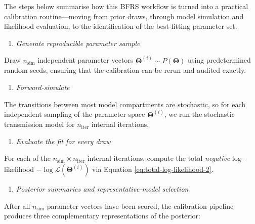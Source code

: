 \documentclass[
]{book}
\providecommand{\tightlist}{%
  \setlength{\itemsep}{0pt}\setlength{\parskip}{0pt}}
\begin{document}
The steps below summarise how this BFRS workflow is turned into a practical calibration routine---moving from prior draws, through model simulation and likelihood evaluation, to the identification of the best-fitting parameter set.

\begin{enumerate}
\def\labelenumi{\arabic{enumi}.}
\tightlist
\item
  \emph{Generate reproducible parameter sample}
\end{enumerate}

Draw \(n_{\text{sim}}\) independent parameter vectors \(\boldsymbol{\Theta}^{(i)} \sim P(\boldsymbol{\Theta})\) using predetermined random seeds, ensuring that the calibration can be rerun and audited exactly.

\begin{enumerate}
\def\labelenumi{\arabic{enumi}.}
\setcounter{enumi}{1}
\tightlist
\item
  \emph{Forward-simulate}
\end{enumerate}

The transitions between most model compartments are stochastic, so for each independent sampling of the parameter space \(\boldsymbol{\Theta}^{(i)}\), we run the stochastic transmission model for \(n_{\text{iter}}\) internal iterations.

\begin{enumerate}
\def\labelenumi{\arabic{enumi}.}
\setcounter{enumi}{2}
\tightlist
\item
  \emph{Evaluate the fit for every draw}
\end{enumerate}

For each of the \(n_{\text{sim}} \times n_{\text{iter}}\) internal iterations, compute the total \emph{negative} log-likelihood \(-\log\mathcal{L}(\boldsymbol{\Theta}^{(i)})\) via Equation \eqref{eq:total-log-likelihood-2}.

\begin{enumerate}
\def\labelenumi{\arabic{enumi}.}
\setcounter{enumi}{3}
\tightlist
\item
  \emph{Posterior summaries and representative-model selection}
\end{enumerate}

After all \(n_{\text{sim}}\) parameter vectors have been scored, the calibration pipeline produces three complementary representations of the posterior:
\end{document}
